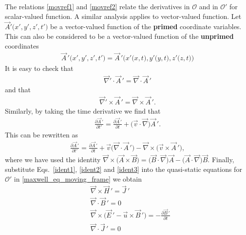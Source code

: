 \documentclass[11pt,a4paper,oneside]{book}
\numberwithin{equation}{section}
\theoremstyle{it}
\theoremstyle{definition}
\begin{document}
The relations \ref{movref1} and \ref{movref2} relate the derivatives in $\mathcal{O}$ and in $\mathcal{O'}$ for scalar-valued function. A similar analysis applies to vector-valued function. Let $\vec{A}'\big(x',y',z',t'\big)$ be a vector-valued function of the \textbf{primed} coordinate variables. This can also be considered to be a vector-valued function of the \textbf{unprimed} coordinates
\begin{equation*}
	\begin{aligned}
		\vec{A}\,'\big(x',y',z',t'\big) = 	\vec{A}\,'\big(x'\big(x,t\big),y'\big(y,t\big),z'\big(z,t\big)\big)
	\end{aligned}
\end{equation*} 
It is easy to check that
\begin{equation}\label{ident1}
	\begin{aligned}
		\vec{\nabla}'\cdot\vec{A}\,' = \vec{\nabla}\cdot\vec{A}\,'
	\end{aligned}
\end{equation} 
and that
\begin{equation}\label{ident2}
	\begin{aligned}
		\vec{\nabla}'\times\vec{A}\,' = \vec{\nabla}\times\vec{A}\,'.
	\end{aligned}
\end{equation} 
Similarly, by taking the time derivative we find that
\begin{equation}
	\begin{aligned}
		\frac{\partial \vec{A}\,'}{\partial t'} = \frac{\partial \vec{A}\,'}{\partial t} + \big(\vec{v}\cdot\vec{\nabla}\big)\vec{A}\,'.
	\end{aligned}
\end{equation} 
This can be rewritten as
  \begin{equation}\label{ident3}
  	\begin{aligned}
  		\frac{\partial \vec{A}\,'}{\partial t'} = \frac{\partial \vec{A}\,'}{\partial t} + \vec{v}\big(\vec{\nabla}\cdot\vec{A}\,'\big)-\vec{\nabla}\times\big(\vec{v}\times\vec{A}\,'\big),
  	\end{aligned}
  \end{equation} 
where we have used the identity $\vec{\nabla}\times\big(\vec{A}\times\vec{B}\big)=\big(\vec{B}\cdot\vec{\nabla}\big)\vec{A}-\big(\vec{A}\cdot\vec{\nabla}\big)\vec{B}$. Finally, substitute Eqs.~\eqref{ident1}, \ref{ident2} and \ref{ident3} into the quasi-static equations for $\mathcal{O}'$ in \ref{maxwell_eq_moving_frame} we obtain 
\begin{equation}\label{maxwell_mov1}
	\begin{aligned}
		&\vec{\nabla}\times\vec{H}\,'=\vec{J}\,' \\[8pt]
		&\vec{\nabla}\cdot\vec{B}\,'= 0 \\[8pt]
		&\vec{\nabla}\times\big(\vec{E}\,'-\vec{u}\times\vec{B}\,'\big)=-\frac{\partial\vec{B}\,'}{\partial t} \\[8pt]
		&\vec{\nabla}\cdot\vec{J}\,'=0
	\end{aligned}
\end{equation} 
\end{document}
